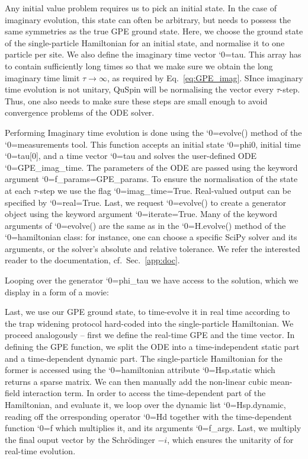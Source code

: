 \documentclass{SciPost}
\newcommand\0{\scalebox{-1}[1]{0}}
\let\svttfamily\ttfamily
\renewcommand\ttfamily{\svttfamily\catcode`0=\active }
\renewcommand\texttt{\bgroup\ttfamily\texttthelp}
\def\texttthelp#1{#1\egroup}
\newcommand{\GPcode}{example4.py}
\begin{document}

Any initial value problem requires us to pick an initial state. In the case of imaginary evolution, this state can often be arbitrary, but needs to possess the same symmetries as the true GPE ground state. Here, we choose the ground state of the single-particle Hamiltonian for an initial state, and normalise it to one particle per site. We also define the imaginary time vector \texttt{tau}. This array has to contain sufficiently long times so that we make sure we obtain the long imaginary time limit $\tau\to\infty$, as required by Eq.~\eqref{eq:GPE_imag}. SInce imaginary time evolution is not unitary, QuSpin will be normalising the vector every $\tau$-step. Thus, one also needs to make sure these steps are small enough to avoid convergence problems of the ODE solver.

Performing Imaginary time evolution is done using the \texttt{evolve()} method of the \texttt{measurements} tool. This function accepts an initial state \texttt{phi0}, initial time \texttt{tau[0]}, and a time vector \texttt{tau} and solves the user-defined ODE \texttt{GPE\_imag\_time}. The parameters of the ODE are passed using the keyword argument \texttt{f\_params=GPE\_params}. To ensure the normalisation of the state at each $\tau$-step we use the flag \texttt{imag\_time=True}. Real-valued output can be specified by \texttt{real=True}. Last, we request \texttt{evolve()} to create a generator object using the keyword argument \texttt{iterate=True}. Many of the keyword arguments of \texttt{evolve()} are the same as in the \texttt{H.evolve()} method of the \texttt{hamiltonian class}: for instance, one can choose a specific SciPy solver and its arguments, or the solver's absolute and relative tolerance. We refer the interested reader to the documentation, cf.~Sec.~\ref{app:doc}.

Looping over the generator \texttt{phi\_tau} we have access to the solution, which we display in a form of a movie:

Last, we use our GPE ground state, to time-evolve it in real time according to the trap widening protocol hard-coded into the single-particle Hamiltonian. We proceed analogously -- first we define the real-time GPE and the time vector. In defining the GPE function, we split the ODE into a time-independent static part and a time-dependent dynamic part. The single-particle Hamiltonian for the former is accessed using the \texttt{hamiltonian} attribute \texttt{Hsp.static} which returns a sparse matrix. We can then manually add the non-linear cubic mean-field interaction term. In order to access the time-dependent part of the Hamiltonian, and evaluate it, we loop over the dynamic list \texttt{Hsp.dynamic}, reading off the orresponding operator \texttt{Hd} together with the time-dependent function \texttt{f} which multiplies it, and its arguments \texttt{f\_args}. Last, we multiply the final ouput vector by the Schr\"odinger $-i$, which ensures the unitarity of for real-time evolution.
\end{document}
